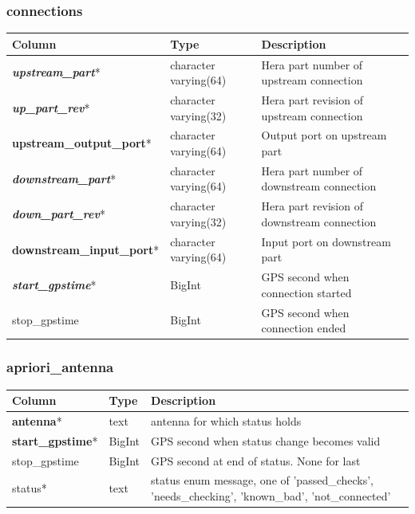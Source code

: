 \documentclass{article}
\begin{document}
{\subsubsection{connections}
\begin{center}
\begin{tabular}{| p{4cm} | p{2cm} | p{10cm} |}
\hline
{\bf Column} & {\bf Type} & {\bf Description} \\ \hline
{\bf \em upstream\_part}* &  character varying(64) & Hera part number of upstream connection \\ \hline
{\bf \em up\_part\_rev}* & character varying(32) & Hera part revision of upstream connection \\ \hline
{\bf upstream\_output\_port}* & character varying(64) & Output port on upstream part \\ \hline
{\bf \em downstream\_part}* & character varying(64) & Hera part number of downstream connection \\ \hline
{\bf \em down\_part\_rev}* & character varying(32) & Hera part revision of downstream connection \\ \hline
{\bf downstream\_input\_port}* & character varying(64) & Input port on downstream part \\ \hline
{\bf \em start\_gpstime}* & BigInt & GPS second when connection started \\ \hline
stop\_gpstime & BigInt & GPS second when connection ended \\ \hline
\end{tabular}
\end{center}

\subsubsection{apriori\_antenna}
\begin{center}
\begin{tabular}{| p{4cm} | p{2cm} | p{10cm} |}
\hline
{\bf Column} & {\bf Type} & {\bf Description} \\ \hline
{\bf antenna}* & text & antenna for which status holds \\ \hline
{\bf start\_gpstime}* & BigInt & GPS second when status change becomes valid \\ \hline
stop\_gpstime & BigInt & GPS second at end of status.  None for last \\ \hline
status* & text & status enum message, one of 'passed\_checks', 'needs\_checking', 'known\_bad', 'not\_connected' \\ \hline
\end{tabular}
\end{center}

}
\end{document}
